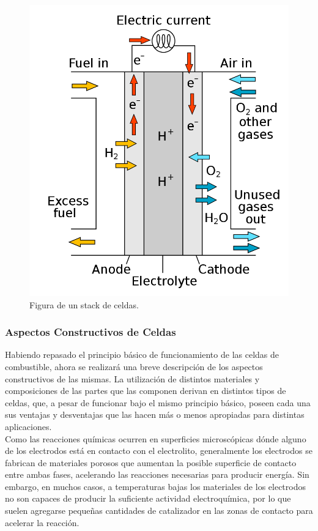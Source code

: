 \begin{figure}[H]
    \centering
    \includegraphics[scale=0.2]{Imagenes/Fuel Cell.png}
    \caption{Figura de un stack de celdas.}
    \label{fuel_cell_stack}
\end{figure}

\subsubsection{Aspectos Constructivos de Celdas}

Habiendo repasado el principio básico de funcionamiento de las celdas de combustible, ahora se realizará una breve descripción de los aspectos constructivos de las mismas. La utilización de distintos materiales y composiciones de las partes que las componen derivan en distintos tipos de celdas, que, a pesar de funcionar bajo el mismo principio básico, poseen cada una sus ventajas y desventajas que las hacen más o menos apropiadas para distintas aplicaciones.\\

Como las reacciones químicas ocurren en superficies microscópicas dónde alguno de los electrodos está en contacto con el electrolito, generalmente los electrodos se fabrican de materiales porosos que aumentan la posible superficie de contacto entre ambas fases, acelerando las reacciones necesarias para producir energía. Sin embargo, en muchos casos, a temperaturas bajas los materiales de los electrodos no son capaces de producir la suficiente actividad electroquímica, por lo que suelen agregarse pequeñas cantidades de catalizador en las zonas de contacto para acelerar la reacción.\\

